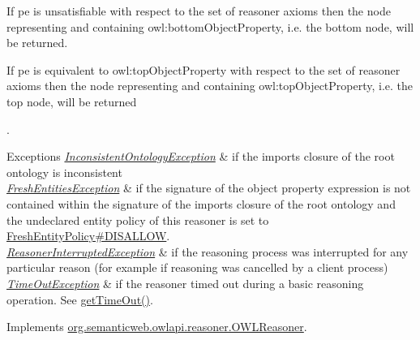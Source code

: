 If {\ttfamily pe} is unsatisfiable with respect to the set of reasoner axioms then the node representing and containing {\ttfamily owl\-:bottom\-Object\-Property}, i.\-e. the bottom node, will be returned. 

If {\ttfamily pe} is equivalent to {\ttfamily owl\-:top\-Object\-Property} with respect to the set of reasoner axioms then the node representing and containing {\ttfamily owl\-:top\-Object\-Property}, i.\-e. the top node, will be returned 

.


\begin{DoxyExceptions}{Exceptions}
{\em \hyperlink{classorg_1_1semanticweb_1_1owlapi_1_1reasoner_1_1_inconsistent_ontology_exception}{Inconsistent\-Ontology\-Exception}} & if the imports closure of the root ontology is inconsistent \\
\hline
{\em \hyperlink{classorg_1_1semanticweb_1_1owlapi_1_1reasoner_1_1_fresh_entities_exception}{Fresh\-Entities\-Exception}} & if the signature of the object property expression is not contained within the signature of the imports closure of the root ontology and the undeclared entity policy of this reasoner is set to \hyperlink{enumorg_1_1semanticweb_1_1owlapi_1_1reasoner_1_1_fresh_entity_policy_a762eae6d5b2449d125311ecaabfdc8d0}{Fresh\-Entity\-Policy\#\-D\-I\-S\-A\-L\-L\-O\-W}. \\
\hline
{\em \hyperlink{classorg_1_1semanticweb_1_1owlapi_1_1reasoner_1_1_reasoner_interrupted_exception}{Reasoner\-Interrupted\-Exception}} & if the reasoning process was interrupted for any particular reason (for example if reasoning was cancelled by a client process) \\
\hline
{\em \hyperlink{classorg_1_1semanticweb_1_1owlapi_1_1reasoner_1_1_time_out_exception}{Time\-Out\-Exception}} & if the reasoner timed out during a basic reasoning operation. See \hyperlink{classorg_1_1semanticweb_1_1owlapi_1_1reasoner_1_1impl_1_1_o_w_l_reasoner_base_af55342eaaabb1b72dacfde7a181b93d2}{get\-Time\-Out()}. \\
\hline
\end{DoxyExceptions}


Implements \hyperlink{interfaceorg_1_1semanticweb_1_1owlapi_1_1reasoner_1_1_o_w_l_reasoner_a38c0fd6583c42adb2a691cc7c477872a}{org.\-semanticweb.\-owlapi.\-reasoner.\-O\-W\-L\-Reasoner}.

